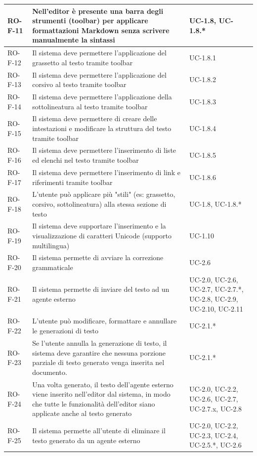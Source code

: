 \documentclass[11pt,a4paper]{article}
\begin{document}
\begin{longtable}{|p{}|>{\raggedright\arraybackslash}p{}|p{}|}
\hline
RO-F-11 & Nell'editor è presente una barra degli strumenti (toolbar) per applicare formattazioni Markdown senza scrivere manualmente la sintassi & UC-1.8, UC-1.8.* \\
\hline
RO-F-12 & Il sistema deve permettere l'applicazione del grassetto al testo tramite toolbar & UC-1.8.1 \\
\hline
RO-F-13 & Il sistema deve permettere l'applicazione del corsivo al testo tramite toolbar & UC-1.8.2 \\
\hline
RO-F-14 & Il sistema deve permettere l'applicazione della sottolineatura al testo tramite toolbar & UC-1.8.3 \\
\hline
RO-F-15 & Il sistema deve permettere di creare delle intestazioni e modificare la struttura del testo tramite toolbar & UC-1.8.4 \\
\hline
RO-F-16 & Il sistema deve permettere l'inserimento di liste ed elenchi nel testo tramite toolbar & UC-1.8.5 \\
\hline
RO-F-17 & Il sistema deve permettere l'inserimento di link e riferimenti tramite toolbar & UC-1.8.6 \\
\hline
RO-F-18 & L'utente può applicare più "stili" (es: grassetto, corsivo, sottolineatura) alla stessa sezione di testo & UC-1.8, UC-1.8.* \\
\hline
RO-F-19 & Il sistema deve supportare l'inserimento e la visualizzazione di caratteri Unicode (supporto multilingua) & UC-1.10 \\
\hline
RO-F-20 & Il sistema permette di avviare la correzione grammaticale & UC-2.6 \\
\hline
RO-F-21 & Il sistema permette di inviare del testo ad un agente esterno & UC-2.0, UC-2.6, UC-2.7, UC-2.7.*, UC-2.8, UC-2.9, UC-2.10, UC-2.11 \\
\hline
RO-F-22 & L’utente può modificare, formattare e annullare le generazioni di testo & UC-2.1.* \\
\hline
RO-F-23 & Se l'utente annulla la generazione di testo, il sistema deve garantire che nessuna porzione parziale di testo generato venga inserita nel documento.
 & UC-2.1.* \\
\hline
RO-F-24 & Una volta generato, il testo dell'agente esterno viene inserito nell'editor dal sistema, in modo che tutte le funzionalità dell'editor siano applicate anche al testo generato & UC-2.0, UC-2.2, UC-2.6, UC-2.7, UC-2.7.x, UC-2.8 \\
\hline
RO-F-25 & Il sistema permette all'utente di eliminare il testo generato da un agente esterno & UC-2.0, UC-2.2, UC-2.3, UC-2.4, UC-2.5.*, UC-2.6 \\

\end{longtable}
\end{document}
